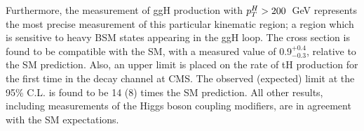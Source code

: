 Furthermore, the measurement of ggH production with $p_T^H>200$~GeV represents the most precise measurement of this particular kinematic region; a region which is sensitive to heavy BSM states appearing in the ggH loop. The cross section is found to be compatible with the SM, with a measured value of $0.9^{+0.4}_{-0.3}$, relative to the SM prediction. Also, an upper limit is placed on the rate of tH production for the first time in the \Hgg decay channel at CMS. The observed (expected) limit at the 95\% C.L. is found to be 14 (8) times the SM prediction. All other results, including measurements of the Higgs boson coupling modifiers, are in agreement with the SM expectations.